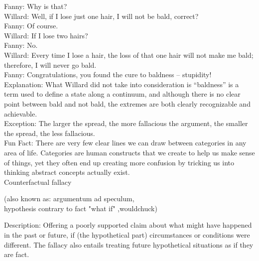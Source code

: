 \documentclass[a4paper,12pt,single,pdftex]{scrbook}
\begin{document}
    
      Fanny: Why is that?
    \\

    
      Willard:  Well, if I lose just one hair, I will not be bald, correct?
    \\

    
      Fanny: Of course.
    \\

    
      Willard: If I lose two hairs?
    \\

    
      Fanny: No.
    \\

    
      Willard: Every time I lose a hair, the loss of that one hair will not make me bald; therefore, I will never go bald.
    \\

    
      Fanny: Congratulations, you found the cure to baldness -- stupidity!
    \\

    
      Explanation: What Willard did not take into consideration is “baldness” is a term used to define a state along a continuum, and although there is no clear point between bald and not bald, the extremes are both clearly recognizable and achievable.
    \\

    
      Exception: The larger the spread, the more fallacious the argument, the smaller the spread, the less fallacious.
    \\

    
      Fun Fact: There are very few clear lines we can draw between categories in any area of life.  Categories are human constructs that we create to help us make sense of things, yet they often end up creating more confusion by tricking us into thinking abstract concepts actually exist.
    \\

  

Counterfactual fallacy
    
      (also known as: argumentum ad speculum,
    \\

    hypothesis contrary to fact "what if" ,wouldchuck)
  
    Description: Offering a poorly supported claim about what might have happened in the past or future, if (the hypothetical part) circumstances or conditions were different.  The fallacy also entails treating future hypothetical situations as if they are fact.
\end{document}
